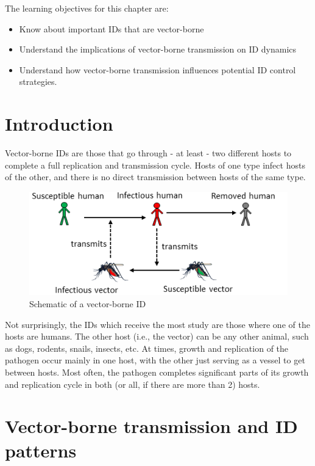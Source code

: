 \documentclass[]{book}
\providecommand{\tightlist}{%
  \setlength{\itemsep}{0pt}\setlength{\parskip}{0pt}}
\theoremstyle{definition}
\theoremstyle{definition}
\theoremstyle{definition}
\theoremstyle{remark}
\begin{document}
The learning objectives for this chapter are:

\begin{itemize}
\tightlist
\item
  Know about important IDs that are vector-borne
\item
  Understand the implications of vector-borne transmission on ID
  dynamics
\item
  Understand how vector-borne transmission influences potential ID
  control strategies.
\end{itemize}

\hypertarget{introduction-5}{%
\section{Introduction}\label{introduction-5}}

Vector-borne IDs are those that go through - at least - two different
hosts to complete a full replication and transmission cycle. Hosts of
one type infect hosts of the other, and there is no direct transmission
between hosts of the same type.

\begin{figure}
\centering
\includegraphics{./images/vectorborne-schematic.png}
\caption{Schematic of a vector-borne ID}
\end{figure}

Not surprisingly, the IDs which receive the most study are those where
one of the hosts are humans. The other host (i.e., the vector) can be
any other animal, such as dogs, rodents, snails, insects, etc. At times,
growth and replication of the pathogen occur mainly in one host, with
the other just serving as a vessel to get between hosts. Most often, the
pathogen completes significant parts of its growth and replication cycle
in both (or all, if there are more than 2) hosts.

\hypertarget{vector-borne-transmission-and-id-patterns}{%
\section{Vector-borne transmission and ID
patterns}\label{vector-borne-transmission-and-id-patterns}}
\end{document}
